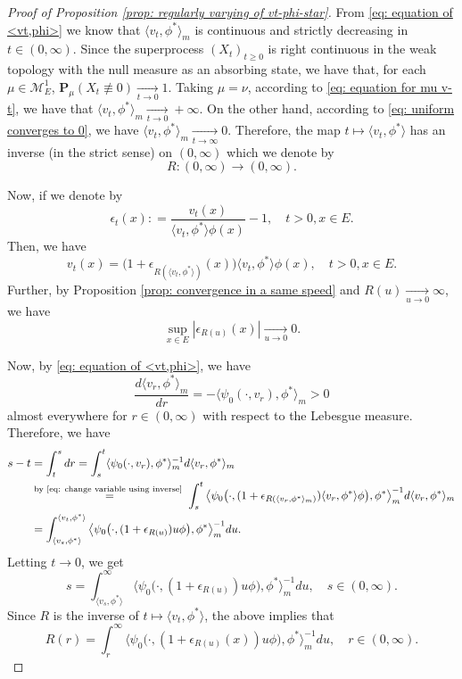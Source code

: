 \documentclass[12pt, a4paper]{amsart}
\theoremstyle{definition}
\numberwithin{equation}{section}
\begin{document}
\begin{proof}[Proof of Proposition \ref{prop: regularly varying of vt-phi-star}]
	
	From \eqref{eq: equation of <vt,phi>} we know that $\langle v_t,\phi^* \rangle_m$ is continuous and strictly decreasing in $t \in (0,\infty)$.
	Since the superprocess $(X_t)_{t\geq 0}$
	is right continuous in the weak topology with the null measure as an absorbing state, we have that, for each $\mu \in \mathcal M_E^1$, $\mathbf P_\mu (X_t \not \equiv 0) \xrightarrow[t\to 0]{} 1$.
	Taking $\mu = \nu$, according to \eqref{eq: equation for mu v-t}, we have that $\langle v_{t}, \phi^*\rangle_m \xrightarrow[t\to 0]{} +\infty$.
	On the other hand, 
	according to \eqref{eq: uniform converges to 0},
	we have $\langle v_{t}, \phi^*\rangle_m \xrightarrow[t\to \infty]{} 0$.
	Therefore, the map $t\mapsto \langle v_t,\phi^*  \rangle$ has an inverse (in the strict sense) on $(0,\infty)$ which we denote by 
\[
	R: (0,\infty) \to (0,\infty).
\]
	
	Now, if we denote by
\[
	\epsilon_{t}(x)
	: = \frac{v_t(x)}{\langle v_t, \phi^*\rangle \phi(x)} - 1,
	\quad t>0, x\in E.
\]
	Then, we have
\[\label{eq: change variable using inverse}
	v_t(x)
	= \big(1+ \epsilon_{R(\langle v_t,\phi^* \rangle)}(x) \big )\langle v_t,\phi^* \rangle \phi(x),
	\quad t>0, x\in E.
\]
	Further, by Proposition \ref{prop: convergence in a same speed} and $R(u)\xrightarrow[u\to 0]{} \infty$, we have
\[\label{eq: epsilon R converges to 0}
	\sup_{x\in E}|\epsilon_{R(u)}(x)|
	\xrightarrow[u\to 0]{} 0.
\]

	Now, by \eqref{eq: equation of <vt,phi>}, we have
\[
	\frac{d \langle v_r, \phi^* \rangle_m}{dr}
	= - \langle \psi_0(\cdot ,v_r) ,\phi^*\rangle_m
	> 0
\]
	almost everywhere for $r\in (0,\infty)$ with respect to the Lebesgue measure.
	Therefore, we have
\[\begin{split}
	s-t
	& = \int_t^s dr
	= \int_s^t \langle \psi_0(\cdot ,v_r), \phi^*\rangle _m^{-1} d\langle v_r ,\phi^* \rangle_m
	\\&\overset{\text{by \eqref{eq: change variable using inverse} }}{=} \int_s^t \big\langle \psi_0\big( \cdot ,(1+ \epsilon_{R(\langle v_r,\phi^* \rangle_m)})\langle v_r,\phi^*\rangle \phi \big), \phi^* \big\rangle _m^{-1} d\langle v_r ,\phi^* \rangle_m
	\\&= \int_{\langle v_s,\phi^*\rangle}^{\langle v_t, \phi^* \rangle} \big\langle \psi_0 \big( \cdot ,( 1 + \epsilon_{R(u)} ) u \phi \big), \phi^* \big\rangle_m^{-1} du.
\end{split}\]
	Letting $t\to 0$, we get 
\[
	s
	= \int_{\langle v_s,\phi^*\rangle}^\infty \big\langle \psi_0 \big(\cdot ,( 1 + \epsilon_{R(u)} ) u \phi \big), \phi^* \big\rangle_m^{-1} du,
	\quad s\in (0,\infty).
\]
	Since $R$ is the inverse of $t\mapsto \langle v_t,\phi^*\rangle$, the above implies that
\[\label{eq: integral equation for R}
	R(r)
	= \int_r^\infty \big\langle \psi_0 \big(\cdot ,( 1 + \epsilon_{R(u)}(x) ) u \phi \big), \phi^* \big\rangle_m^{-1} du,
	\quad r\in (0,\infty).
\]
	

\end{proof}
\end{document}
